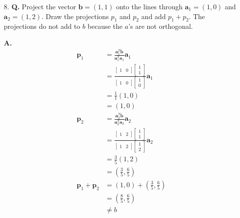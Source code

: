 \documentclass[main.tex]{subfiles}
\begin{document}
\begin{enumerate}
\begin{enumerate}
    \end{enumerate}


    \item [8.] \textbf{Q.} Project the vector $\boldsymbol{b}=(1,1)$ onto the lines through $\boldsymbol{a}_{1}=(1,0)$ and $\boldsymbol{a}_{2}=(1,2)$. Draw the projections $p_{1}$ and $p_{2}$ and add $p_{1}+p_{2}$. The projections do not add to $b$ because the $a$'s are not orthogonal. 
    
    \textbf{A.}
    $$
    \begin{aligned}
    \bm{p}_{1} &= \frac{\bm{a}_{1}^{T} \bm{b}}{\bm{a}_{1}^{T} \bm{a}_{1}} \bm{a}_{1}\\
    &=\frac{\left[\begin{array}{ll}
    1 & 0
    \end{array}\right]\left[\begin{array}{l}
    1 \\
    1
    \end{array}\right]}{\left[\begin{array}{ll}
    1 & 0
    \end{array}\right]\left[\begin{array}{l}
    1 \\
    0
    \end{array}\right]}\bm{a}_{1} \\
    &=\frac{1}{1}(1,0) \\
    &=(1,0) \\
    \bm{p}_{2} &= \frac{\bm{a}_{2}^{T} \bm{b}}{\bm{a}_{2}^{T} \bm{a}_{2}} \bm{a}_{2}\\
    & = \frac{\left[\begin{array}{ll}
    1 & 2
    \end{array}\right]\left[\begin{array}{l}
    1 \\
    1
    \end{array}\right]}{\left[\begin{array}{ll}
    1 & 2
    \end{array}\right]\left[\begin{array}{l}
    1 \\
    2
    \end{array}\right]}\bm{a}_{2}\\
    & = \frac{3}{5}(1,2) \\
    & = \left(\frac{3}{5}, \frac{6}{5}\right)\\
    \bm{p}_{1}+\bm{p}_{2} &=(1,0)+\left(\frac{3}{5}, \frac{6}{5}\right) \\
    &=\left(\frac{8}{5}, \frac{6}{5}\right) \\
    & \neq b
    \end{aligned}
    $$
    

\end{enumerate}
\end{document}
